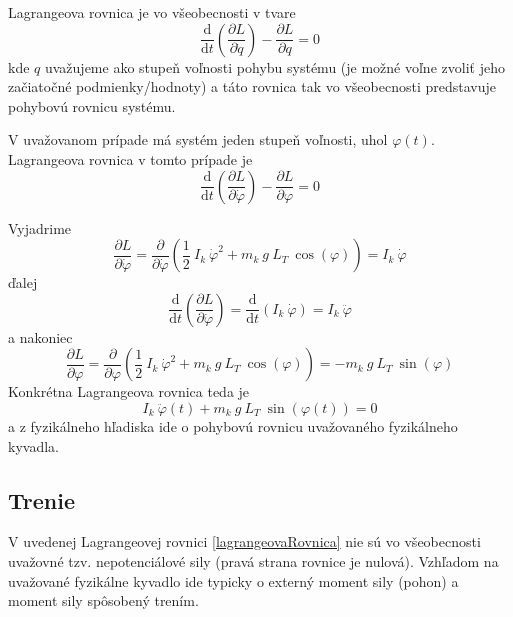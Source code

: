 \documentclass[a4paper, 10pt, ]{article}
\begin{document}
Lagrangeova rovnica je vo všeobecnosti v tvare
\begin{equation} \label{lagrangeovaRovnica}
    \frac{\text{d}}{\text{d}t} \left( \frac{\partial L}{\partial \dot{q}} \right) - \frac{\partial L}{\partial q} = 0
\end{equation}
kde $q$ uvažujeme ako stupeň voľnosti pohybu systému (je možné voľne zvoliť jeho začiatočné podmienky/hodnoty) a táto rovnica tak vo všeobecnosti predstavuje pohybovú rovnicu systému. 

V uvažovanom prípade má systém jeden stupeň voľnosti, uhol $\varphi(t)$. Lagrangeova rovnica v tomto prípade je
\begin{equation}
    \frac{\text{d}}{\text{d}t} \left( \frac{\partial L}{\partial \dot{\varphi}} \right) - \frac{\partial L}{\partial \varphi} = 0
\end{equation}

Vyjadrime
\begin{equation}
    \frac{\partial L}{\partial \dot{\varphi}} = \frac{\partial}{\partial \dot{\varphi}} \left( \frac{1}{2} \  I_k \  \dot\varphi^2 + m_k \  g \   L_T \  \cos(\varphi) \right) = I_k \  \dot\varphi
\end{equation}
ďalej
\begin{equation}
    \frac{\text{d}}{\text{d}t} \left( \frac{\partial L}{\partial \dot{\varphi}} \right) = \frac{\text{d}}{\text{d}t} \left( I_k \  \dot\varphi \right) = I_k \  \ddot\varphi
\end{equation}
a nakoniec
\begin{equation}
    \frac{\partial L}{\partial \varphi} = \frac{\partial}{\partial \varphi} \left( \frac{1}{2} \  I_k \  \dot\varphi^2 + m_k \  g \   L_T \  \cos(\varphi) \right) = - m_k \  g \   L_T \  \sin(\varphi)
\end{equation}
Konkrétna Lagrangeova rovnica teda je
\begin{equation} \label{pohybovaRovnicaKyvadla}
    I_k \  \ddot\varphi(t) + m_k \  g \   L_T \  \sin(\varphi(t)) = 0
\end{equation}
a z fyzikálneho hľadiska ide o pohybovú rovnicu uvažovaného fyzikálneho kyvadla.



\subsection{Trenie}

V uvedenej Lagrangeovej rovnici \eqref{lagrangeovaRovnica} nie sú vo všeobecnosti uvažovné tzv. nepotenciálové sily (pravá strana rovnice je nulová). Vzhľadom na uvažované fyzikálne kyvadlo ide typicky o externý moment sily (pohon) a moment sily spôsobený trením.
\end{document}

